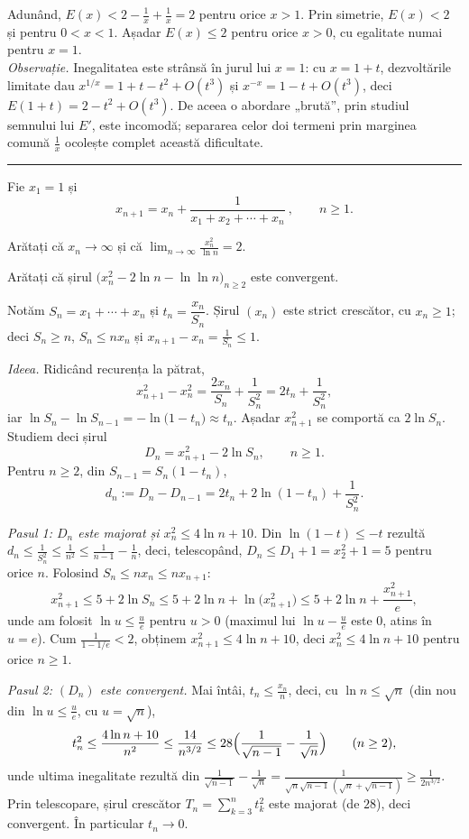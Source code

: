 Adunând, $E(x)<2-\frac1x+\frac1x=2$ pentru orice $x>1$. Prin simetrie, $E(x)<2$ și pentru $0<x<1$. Așadar $E(x)\le2$ pentru orice $x>0$, cu egalitate numai pentru $x=1$.\\[2pt]
\emph{Observație.} Inegalitatea este strânsă în jurul lui $x=1$: cu $x=1+t$, dezvoltările limitate dau $x^{1/x}=1+t-t^2+O(t^3)$ și $x^{-x}=1-t+O(t^3)$, deci $E(1+t)=2-t^2+O(t^3)$. De aceea o abordare „brută'', prin studiul semnului lui $E'$, este incomodă; separarea celor doi termeni prin marginea comună $\frac1x$ ocolește complet această dificultate.
\vspace{1mm}\hrule

Fie $x_1=1$ și
\[ x_{n+1}=x_n+\frac{1}{x_1+x_2+\cdots+x_n}\ ,\qquad n\ge1 . \]
\begin{parti}
  \item Arătați că $x_n\to\infty$ și că $\displaystyle\lim_{n\to\infty}\frac{x_n^{2}}{\ln n}=2$.
  \item Arătați că șirul $\bigl(x_n^{2}-2\ln n-\ln\ln n\bigr)_{n\ge2}$ este convergent.
\end{parti}
\sol Notăm $S_n=x_1+\cdots+x_n$ și $t_n=\dfrac{x_n}{S_n}$. Șirul $(x_n)$ este strict crescător, cu $x_n\ge1$; deci $S_n\ge n$, $S_n\le nx_n$ și $x_{n+1}-x_n=\frac1{S_n}\le1$.

\emph{Ideea.} Ridicând recurența la pătrat,
\[ x_{n+1}^2-x_n^2=\frac{2x_n}{S_n}+\frac{1}{S_n^2}=2t_n+\frac1{S_n^2}, \]
iar $\ln S_n-\ln S_{n-1}=-\ln\bigl(1-t_n\bigr)\approx t_n$. Așadar $x_{n+1}^2$ se comportă ca $2\ln S_n$. Studiem deci șirul
\[ D_n=x_{n+1}^2-2\ln S_n,\qquad n\ge1 . \]
Pentru $n\ge2$, din $S_{n-1}=S_n(1-t_n)$,
\[ d_n:=D_n-D_{n-1}=2t_n+2\ln(1-t_n)+\frac{1}{S_n^2} . \tag{1} \]

\emph{Pasul 1: $D_n$ este majorat și $x_n^2\le4\ln n+10$.} Din $\ln(1-t)\le-t$ rezultă $d_n\le\frac1{S_n^2}\le\frac1{n^2}\le\frac1{n-1}-\frac1n$, deci, telescopând, $D_n\le D_1+1=x_2^2+1=5$ pentru orice $n$. Folosind $S_n\le nx_n\le nx_{n+1}$:
\[ x_{n+1}^2\le5+2\ln S_n\le5+2\ln n+\ln\bigl(x_{n+1}^2\bigr)\le5+2\ln n+\frac{x_{n+1}^2}{e}, \]
unde am folosit $\ln u\le\frac ue$ pentru $u>0$ (maximul lui $\ln u-\frac ue$ este $0$, atins în $u=e$). Cum $\frac{1}{1-1/e}<2$, obținem $x_{n+1}^2\le 4\ln n+10$, deci $x_n^2\le4\ln n+10$ pentru orice $n\ge1$.

\emph{Pasul 2: $(D_n)$ este convergent.} Mai întâi, $t_n\le\frac{x_n}{n}$, deci, cu $\ln n\le\sqrt n$ (din nou din $\ln u\le\frac ue$, cu $u=\sqrt n$),
\[ t_n^2\le\frac{4\ln n+10}{n^2}\le\frac{14}{n^{3/2}}\le28\Bigl(\frac1{\sqrt{n-1}}-\frac1{\sqrt n}\Bigr)\qquad(n\ge2), \]
unde ultima inegalitate rezultă din $\frac1{\sqrt{n-1}}-\frac1{\sqrt n}=\frac{1}{\sqrt n\sqrt{n-1}\,(\sqrt n+\sqrt{n-1})}\ge\frac{1}{2n^{3/2}}$. Prin telescopare, șirul crescător $T_n=\sum_{k=3}^{n}t_k^2$ este majorat (de $28$), deci convergent. În particular $t_n\to0$.

